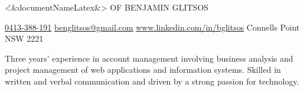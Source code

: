 \documentclass{resume}
\begin{document}
\h{<&documentNameLatex&> OF BENJAMIN GLITSOS}

\begin{center}
    \href{tel:0413-388-191}{0413-388-191} \textbar{} \href{mailto:benglitsos@gmail.com}{benglitsos@gmail.com} \textbar{} \href{https://www.linkedin.com/in/bglitsos/}{www.linkedin.com/in/bglitsos} \textbar{} Connells Point NSW 2221
\end{center}


\begin{center}
    Three years' experience in account management involving business analysis and project management of web applications and information systems. Skilled in written and verbal communication and driven by a strong passion for technology.
\end{center}

\end{document}
